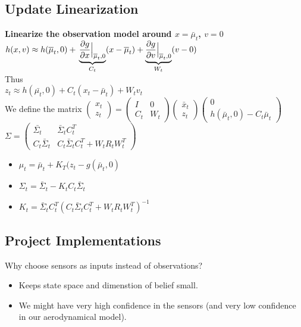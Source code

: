 \subsection*{Update Linearization}
\textbf{Linearize the observation model around $x = \bar{\mu}_t$,
$v=0$}\\
$h(x, v) \approx h(\bar{\mu}_t, 0) + \\
\underbrace{\dfrac{\partial g}{\partial x}\Bigr|_{\substack{\bar{\mu}_t,
0}}}_{C_t}(x - \bar{\mu}_t) +
\underbrace{\dfrac{\partial g}{\partial v}\Bigr|_{\substack{\bar{\mu}_t,
0}}}_{W_t}(v - 0)$\\

Thus\\
$z_t \approx h(\bar{\mu_t}, 0) + C_t (x_t - \bar{\mu}_t) + W_t  v_t$\\
We define the matrix
$
\begin{pmatrix}
  x_t \\ z_t
\end{pmatrix} =
\begin{pmatrix}
  I & 0\\C_t & W_t
\end{pmatrix}
\begin{pmatrix}
  \bar{x}_t \\ z_t
\end{pmatrix}
\begin{pmatrix}
  0 \\ h(\bar{\mu}_t, 0) - C_t \bar{\mu}_t
\end{pmatrix}
$
$
\Sigma =
\begin{pmatrix}
  \bar{\Sigma_t} & \bar{\Sigma}_t C_t^T\\
  C_t \bar{\Sigma}_t & C_t \bar{\Sigma}_t C_t^T + W_t R_t W_t^T
\end{pmatrix}
$

\begin{itemize}
\item $\mu_t = \bar{\mu}_t + K_T(z_t - g(\bar{\mu}_t, 0)$
  \item $\Sigma_t = \bar{\Sigma}_t - K_t C_t \bar{\Sigma}_t$
  \item $K_t = \bar{\Sigma}_t C_t^T (C_t \bar{\Sigma}_t C_t^T + W_t R_t
    W_t^T)^{-1}$
\end{itemize}

\subsection*{Project Implementations}
Why choose sensors as inputs instead of observations?
\begin{itemize}
  \item Keeps state space and dimenstion of belief small.
  \item We might have very high confidence in the sensors (and very low
    confidence in our aerodynamical model).
\end{itemize}


